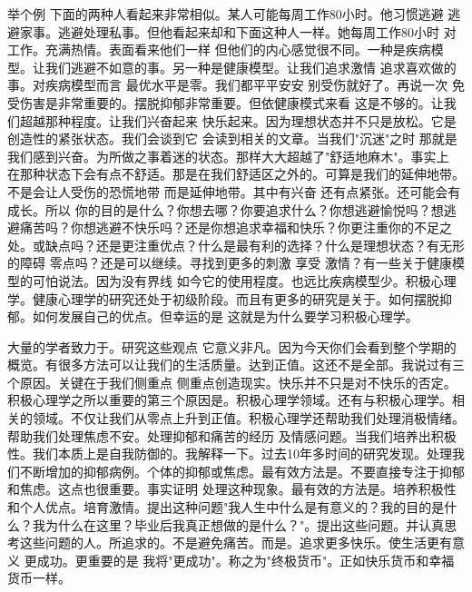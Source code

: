 举个例 下面的两种人看起来非常相似。某人可能每周工作80小时。他习惯逃避 逃避家事。逃避处理私事。但他看起来却和下面这种人一样。她每周工作80小时 对工作。充满热情。表面看来他们一样 但他们的内心感觉很不同。一种是疾病模型。让我们逃避不如意的事。另一种是健康模型。让我们追求激情 追求喜欢做的事。对疾病模型而言 最优水平是零。我们都平平安安 别受伤就好了。再说一次 免受伤害是非常重要的。摆脱抑郁非常重要。但依健康模式来看 这是不够的。让我们超越那种程度。让我们兴奋起来 快乐起来。因为理想状态并不只是放松。它是创造性的紧张状态。我们会谈到它 会读到相关的文章。当我们"沉迷"之时 那就是我们感到兴奋。为所做之事着迷的状态。那样大大超越了"舒适地麻木"。事实上 在那种状态下会有点不舒适。那是在我们舒适区之外的。可算是我们的延伸地带。不是会让人受伤的恐慌地带 而是延伸地带。其中有兴奋 还有点紧张。还可能会有成长。所以 你的目的是什么？你想去哪？你要追求什么？你想逃避愉悦吗？想逃避痛苦吗？你想逃避不快乐吗？还是你想追求幸福和快乐？你更注重你的不足之处。或缺点吗？还是更注重优点？什么是最有利的选择？什么是理想状态？有无形的障碍 零点吗？还是可以继续。寻找到更多的刺激 享受 激情？有一些关于健康模型的可怕说法。因为没有界线 如今它的使用程度。也远比疾病模型少。积极心理学。健康心理学的研究还处于初级阶段。而且有更多的研究是关于。如何摆脱抑郁。如何发展自己的优点。但幸运的是 这就是为什么要学习积极心理学。 

大量的学者致力于。研究这些观点 它意义非凡。因为今天你们会看到整个学期的概览。有很多方法可以让我们的生活质量。达到正值。这还不是全部。我说过有三个原因。关键在于我们侧重点 侧重点创造现实。快乐并不只是对不快乐的否定。积极心理学之所以重要的第三个原因是。积极心理学领域。还有与积极心理学。相关的领域。不仅让我们从零点上升到正值。积极心理学还帮助我们处理消极情绪。帮助我们处理焦虑不安。处理抑郁和痛苦的经历 及情感问题。当我们培养出积极性。我们本质上是自我防御的。我解释一下。过去10年多时间的研究发现。处理我们不断增加的抑郁病例。个体的抑郁或焦虑。最有效方法是。不要直接专注于抑郁和焦虑。这点也很重要。事实证明 处理这种现象。最有效的方法是。培养积极性和个人优点。培育激情。提出这种问题"我人生中什么是有意义的？我的目的是什么？我为什么在这里？毕业后我真正想做的是什么？"。提出这些问题。并认真思考这些问题的人。所追求的。不是避免痛苦。而是。追求更多快乐。使生活更有意义 更成功。更重要的是 我将"更成功"。称之为"终极货币"。正如快乐货币和幸福货币一样。 

